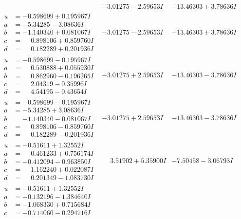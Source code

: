 \documentclass[1p]{elsarticle_modified}
\theoremstyle{definition}
\begin{document}
$$\begin{array}{c|c|c}
 & -3.01275 - 2.59653 I & -13.46303 + 3.78636 I \\ \hline\begin{aligned}
u &= -0.598699 + 0.195967 I \\
a &= -5.34285 - 3.08636 I \\
b &= -1.140340 + 0.081067 I \\
c &= \phantom{-}0.898106 + 0.859760 I \\
d &= \phantom{-}0.182289 + 0.201936 I\end{aligned}
 & -3.01275 - 2.59653 I & -13.46303 + 3.78636 I \\ \hline\begin{aligned}
u &= -0.598699 - 0.195967 I \\
a &= \phantom{-}0.530888 + 0.055930 I \\
b &= \phantom{-}0.862960 - 0.196265 I \\
c &= \phantom{-}2.04319 - 0.35996 I \\
d &= \phantom{-}4.54195 - 0.43654 I\end{aligned}
 & -3.01275 + 2.59653 I & -13.46303 - 3.78636 I \\ \hline\begin{aligned}
u &= -0.598699 - 0.195967 I \\
a &= -5.34285 + 3.08636 I \\
b &= -1.140340 - 0.081067 I \\
c &= \phantom{-}0.898106 - 0.859760 I \\
d &= \phantom{-}0.182289 - 0.201936 I\end{aligned}
 & -3.01275 + 2.59653 I & -13.46303 - 3.78636 I \\ \hline\begin{aligned}
u &= -0.51611 + 1.32552 I \\
a &= \phantom{-}0.461233 + 0.756174 I \\
b &= -0.412094 - 0.963850 I \\
c &= \phantom{-}1.162240 + 0.022087 I \\
d &= \phantom{-}0.201349 - 1.083730 I\end{aligned}
 & \phantom{-}3.51902 + 5.35900 I & -7.50458 - 3.06793 I \\ \hline\begin{aligned}
u &= -0.51611 + 1.32552 I \\
a &= -0.132196 - 1.384640 I \\
b &= -1.068330 + 0.715684 I \\
c &= -0.714060 - 0.294716 I \\

\end{aligned}
\end{array}$$
\end{document}
